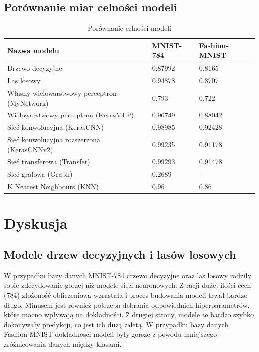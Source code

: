 \documentclass{article}
\begin{document}
\subsection{Porównanie miar celności modeli}

\begin{table}[H]
    \centering
    \begin{tabular}{| l | l | l |}
    \hline
    \textbf{Nazwa modelu} & \textbf{MNIST-784} & \textbf{Fashion-MNIST} \\
    \hline
    Drzewo decyzyjne & 0.87992 & 0.8165 \\
    \hline
    Las losowy & 0.94878 & 0.8707 \\
    \hline
    Własny wielowarstwowy perceptron (MyNetwork) & 0.793 & 0.722 \\
    \hline
    Wielowarstwowy perceptron (KerasMLP)  & 0.96749 & 0.88042 \\
    \hline
    Sieć konwolucyjna (KerasCNN) & 0.98985 & 0.92428 \\
    \hline
    Sieć konwolucyjna rozszerzona (KerasCNNv2) & 0.99235 & 0.91178 \\
    \hline
    Sieć transferowa (Transfer) & 0.99293 & 0.91478 \\
    \hline
    Sieć grafowa (Graph) & 0.2689 & -- \\
    \hline
    K Nearest Neighbours (KNN) & 0.96 & 0.86 \\
    \hline
    \end{tabular}
    \caption{Porównanie celności modeli}
\end{table}

\section{Dyskusja}

\subsection*{Modele drzew decyzyjnych i lasów losowych}
W przypadku bazy danych MNIST-784 drzewo decyzyjne oraz las 
losowy radziły sobie zdecydowanie gorzej niż modele sieci neuronowych. 
Z racji dużej ilości cech (784) złożoność obliczeniowa wzrastała
i proces budowania modeli trwał bardzo długo. Minusem jest również
potrzeba dobrania odpowiednich hiperparametrów, które mocno wpływają
na dokładności. Z drugiej strony, modele te bardzo szybko dokonywały
predykcji, co jest ich dużą zaletą. W przypadku bazy danych Fashion-MNIST
dokładności modeli były gorsze z powodu mniejszego zróżnicowania danych
między klasami.
\end{document}
